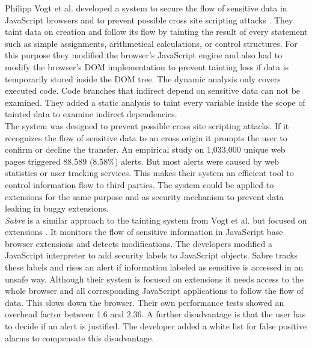 		Philipp Vogt et al. developed a system to secure the flow of sensitive data in JavaScript browsers and to prevent possible cross site scripting attacks \cite{ndss2007xss} . They taint data on creation and follow its flow by tainting the result of every statement such as simple assignments, arithmetical calculations, or control structures. For this purpose they modified the browser's JavaScript engine and also had to modify the browser's DOM implementation to prevent tainting loss if data is temporarily stored inside the DOM tree. The dynamic analysis only covers executed code. Code branches that indirect depend on sensitive data can not be examined. They added a static analysis to taint every variable inside the scope of tainted data to examine indirect dependencies. \\
		The system was designed to prevent possible cross site scripting attacks. If it recognizes the flow of sensitive data to an cross origin it prompts the user to confirm or decline the transfer. An empirical study on 1,033,000 unique web pages triggered 88,589 (8.58\%) alerts. But most alerts were caused by web statistics or user tracking services. This makes their system an efficient tool to control information flow to third parties. The system could be applied to extensions for the same purpose and as security mechanism to prevent data leaking in buggy extensions. \\
		
		\textit{Sabre} is a similar approach to the tainting system from Vogt et al. but focused on extensions \cite{Dhawan:2009:AIF:1723192.1723250, ndss2007xss}. It monitors the flow of sensitive information in JavaScript base browser extensions and detects modifications. The developers modified a JavaScript interpreter to add security labels to JavaScript objects. Sabre tracks these labels and rises an alert if information labeled as sensitive is accessed in an unsafe way. Although their system is focused on extensions it needs access to the whole browser and all corresponding JavaScript applications to follow the flow of data. This slows down the browser. Their own performance tests showed an overhead factor between 1.6 and 2.36. A further disadvantage is that the user has to decide if an alert is justified. The developer added a white list for false positive alarms to compensate this disadvantage. \\

